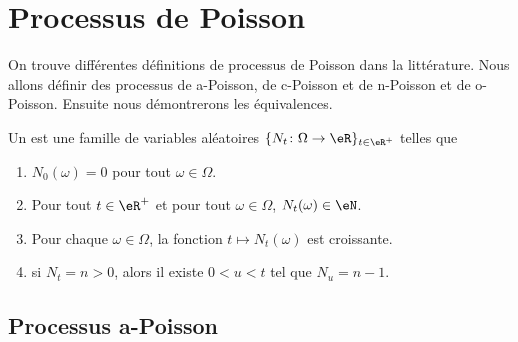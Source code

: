 
\section{Processus de Poisson}
\label{SecHxbtzQ}

On trouve différentes définitions de processus de Poisson dans la littérature. Nous allons définir des processus de a-Poisson, de c-Poisson et de n-Poisson et de o-Poisson. Ensuite nous démontrerons les équivalences.

\begin{definition}		\label{DEFooEVRIooZQJRSZ}
	Un  est une famille de variables aléatoires \( \{ N_t\colon \Omega\to \eR \}_{t\in \eR^+}\) telles que
	\begin{enumerate}
		\item
		      \( N_0(\omega)=0\) pour tout \( \omega\in \Omega\).
		\item
		      Pour tout \( t\in \eR^+\) et pour tout \( \omega\in \Omega\), \( N_t(\omega)\in \eN\).
		\item
		      Pour chaque \( \omega\in \Omega\), la fonction \( t\mapsto N_t(\omega)\) est croissante.
		\item		\label{ITEMooXOEPooGewUBL}
		      si \( N_t=n>0\), alors il existe \( 0<u<t\) tel que \( N_u=n-1\).
	\end{enumerate}
\end{definition}


\subsection{Processus a-Poisson}

